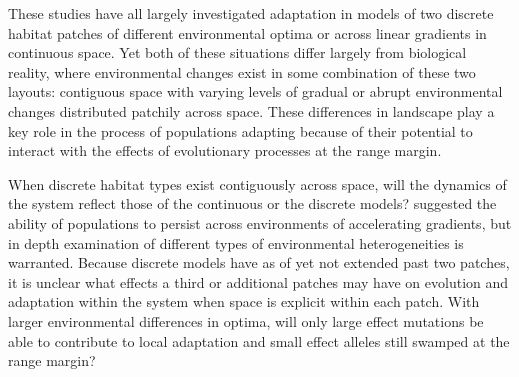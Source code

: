 These studies have all largely investigated adaptation in models of two discrete habitat patches of different environmental optima or across linear gradients in continuous space. Yet both of these situations differ largely from biological reality, where environmental changes exist in some combination of these two layouts: contiguous space with varying levels of gradual or abrupt environmental changes distributed patchily across space. %
These differences in landscape play a key role in the process of populations adapting because of their potential to interact with the effects of evolutionary processes at the range margin. 

When discrete habitat types exist contiguously across space, will the dynamics of the system reflect those of the continuous or the discrete models? %
\citet{Barton:2001} suggested the ability of populations to persist across environments of accelerating gradients, but in depth examination of different types of environmental heterogeneities is warranted. Because discrete models have as of yet not extended past two patches, it is unclear what effects a third or additional patches may have on evolution and adaptation within the system when space is explicit within each patch. With larger environmental differences in optima, will only large effect mutations be able to contribute to local adaptation and small effect alleles still swamped at the range margin?

